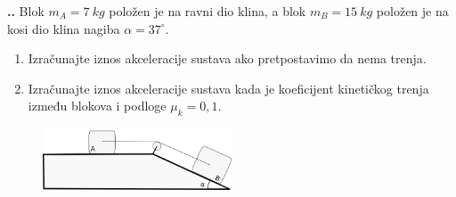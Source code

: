 

\noindent 
\textbf{
\thecjelina.\thezadatak.}
Blok $m_A = 7\ kg$ položen je na ravni dio klina, a blok $m_B = 15\ kg$ polo\v{z}en je na kosi dio
klina nagiba $\alpha = 37^\circ$.
\begin{enumerate}[label=\alph*)]
 \item Izra\v{c}unajte iznos akceleracije sustava ako pretpostavimo da nema trenja.
 \item Izra\v{c}unajte iznos akceleracije sustava kada je koeficijent kineti\v{c}kog trenja između
blokova i podloge \(\mu_k = 0,1\).
\end{enumerate}
\begin{figure}[h]%
  \begin{center}
    \includegraphics[width=0.5\textwidth]{../03_Dinamika_materijalne_tocke/Zadatak_D730.png}
  \end{center}
\end{figure}

